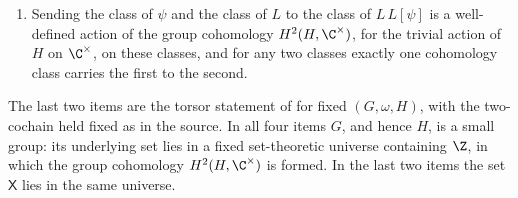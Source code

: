 \begin{lemma}
\begin{enumerate}
              $\omega$. An $L$-symbol $L$ is compatible with $\omega$ if and
              only if $L$ is action-gauge equivalent to $L_0L[\psi]$ for
              some $2$-cocycle $\psi$ on $H$, and $L_0L[\psi_1]$ and
              $L_0L[\psi_2]$ are action-gauge equivalent if and only if
              $\psi_1\sim\psi_2$. Hence sending the class of $\psi$ to the
              class of $L_0L[\psi]$ is a bijection from $H^2(H,\C^\times)$
              onto the action-gauge classes of $L$-symbols compatible with
              $\omega$.
        \item Sending the class of $\psi$ and the class of $L$ to the
              class of $L\,L[\psi]$ is a well-defined action of the group
              cohomology $H^2(H,\C^\times)$, for the trivial action of $H$
              on $\C^\times$, on these classes, and for any two classes
              exactly one cohomology class carries the first to the second.
    \end{enumerate}
    The last two items are the torsor statement of \cite{GarreRubio2023MPOSym}
    for fixed $(G,\omega,H)$, with the two-cochain held fixed as in the
    source. In all four items $G$, and hence $H$, is a small group: its
    underlying set lies in a fixed set-theoretic universe containing $\Z$,
    in which the group cohomology $H^2(H,\C^\times)$ is formed. In the last
    two items the set $\mathsf X$ lies in the same universe.
\end{lemma}
